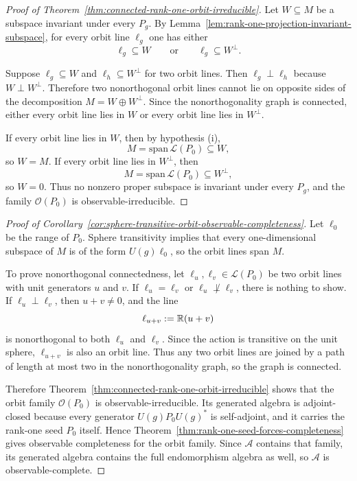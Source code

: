 \begin{proof}[Proof of Theorem~\ref{thm:connected-rank-one-orbit-irreducible}]
\label{proof:thm:connected-rank-one-orbit-irreducible}
Let $W\subseteq M$ be a subspace invariant under every $P_g$.
By Lemma~\ref{lem:rank-one-projection-invariant-subspace}, for every orbit
line $\ell_g$ one has either
\[
\ell_g\subseteq W
\qquad\text{or}\qquad
\ell_g\subseteq W^{\perp}.
\]

Suppose $\ell_g\subseteq W$ and $\ell_h\subseteq W^{\perp}$ for two orbit
lines. Then $\ell_g\perp \ell_h$ because $W\perp W^{\perp}$. Therefore two
nonorthogonal orbit lines cannot lie on opposite sides of the decomposition
$M=W\oplus W^{\perp}$. Since the nonorthogonality graph is connected, either
every orbit line lies in $W$ or every orbit line lies in $W^{\perp}$.

If every orbit line lies in $W$, then by hypothesis (i),
\[
M=\mathrm{span}\,\mathcal L(P_0)\subseteq W,
\]
so $W=M$. If every orbit line lies in $W^{\perp}$, then
\[
M=\mathrm{span}\,\mathcal L(P_0)\subseteq W^{\perp},
\]
so $W=0$. Thus no nonzero proper subspace is invariant under every $P_g$, and
the family $\mathcal O(P_0)$ is observable-irreducible.
\end{proof}

\begin{proof}[Proof of Corollary~\ref{cor:sphere-transitive-orbit-observable-completeness}]
\label{proof:cor:sphere-transitive-orbit-observable-completeness}
Let $\ell_0$ be the range of $P_0$. Sphere transitivity implies that every
one-dimensional subspace of $M$ is of the form $U(g)\ell_0$, so the orbit
lines span $M$.

To prove nonorthogonal connectedness, let $\ell_u,\ell_v\in\mathcal L(P_0)$ be
two orbit lines with unit generators $u$ and $v$. If $\ell_u=\ell_v$ or
$\ell_u\not\perp\ell_v$, there is nothing to show. If $\ell_u\perp\ell_v$,
then $u+v\neq 0$, and the line
\[
\ell_{u+v}:=\mathbb{R}(u+v)
\]
is nonorthogonal to both $\ell_u$ and $\ell_v$. Since the action is
transitive on the unit sphere, $\ell_{u+v}$ is also an orbit line. Thus any
two orbit lines are joined by a path of length at most two in the
nonorthogonality graph, so the graph is connected.

Therefore Theorem~\ref{thm:connected-rank-one-orbit-irreducible} shows that
the orbit family $\mathcal O(P_0)$ is observable-irreducible. Its generated
algebra is adjoint-closed because every generator $U(g)P_0U(g)^*$ is
self-adjoint, and it carries the rank-one seed $P_0$ itself. Hence
Theorem~\ref{thm:rank-one-seed-forces-completeness} gives observable
completeness for the orbit family. Since $\mathcal A$ contains that family,
its generated algebra contains the full endomorphism algebra as well, so
$\mathcal A$ is observable-complete.
\end{proof}

